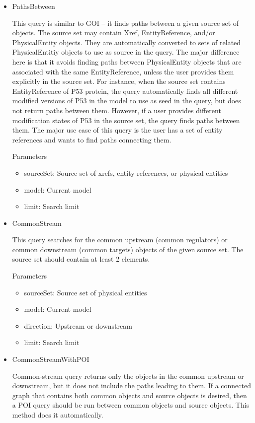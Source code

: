\documentclass{tufte-book}
\begin{document}
\begin{itemize}
\item PathsBetween 

This query is similar to GOI – it finds paths between a given source set of objects. The source set may contain Xref, EntityReference, and/or PhysicalEntity objects. They are automatically converted to sets of related PhysicalEntitiy objects to use as source in the query. The major difference here is that it avoids finding paths between PhysicalEntity objects that are associated with the same EntityReference, unless the user provides them explicitly in the source set. For instance, when the source set contains EntityReference of P53 protein, the query automatically finds all different modified versions of P53 in the model to use as seed in the query, but does not return paths between them. However, if a user provides different modification states of P53 in the source set, the query finds paths between them. The major use case of this query is the user has a set of entity references and wants to find paths connecting them.

Parameters

\begin{itemize}
\item sourceSet: Source set of xrefs, entity references, or physical entities
\item model: Current model
\item limit: Search limit
\end{itemize}


\item CommonStream

This query searches for the common upstream (common regulators) or common downstream (common targets) objects of the given source set. The source set should contain at least 2 elements.

Parameters

\begin{itemize}
\item sourceSet: Source set of physical entities
\item model: Current model
\item direction: Upstream or downstream
\item limit: Search limit
\end{itemize}


\item CommonStreamWithPOI

Common-stream query returns only the objects in the common upstream or downstream, but it does not include the paths leading to them. If a connected graph that contains both common objects and source objects is desired, then a POI query should be run between common objects and source objects. This method does it automatically.


\end{itemize}
\end{document}
